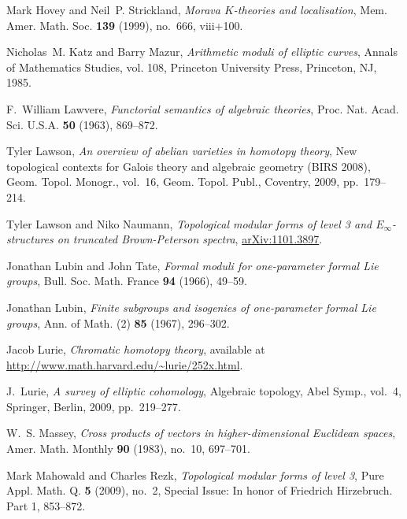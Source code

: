 \documentclass{gtpart}
\theoremstyle{definition}
\theoremstyle{remark}
\begin{document}
\begin{thebibliography}
Mark Hovey and Neil~P. Strickland, \emph{Morava {$K$}-theories and
  localisation}, Mem. Amer. Math. Soc. \textbf{139} (1999), no.~666, viii+100.

Nicholas~M. Katz and Barry Mazur, \emph{Arithmetic moduli of elliptic curves},
  Annals of Mathematics Studies, vol. 108, Princeton University Press,
  Princeton, NJ, 1985. 

F.~William Lawvere, \emph{Functorial semantics of algebraic theories}, Proc.
  Nat. Acad. Sci. U.S.A. \textbf{50} (1963), 869--872. 

Tyler Lawson, \emph{An overview of abelian varieties in homotopy theory}, New
  topological contexts for {G}alois theory and algebraic geometry ({BIRS}
  2008), Geom. Topol. Monogr., vol.~16, Geom. Topol. Publ., Coventry, 2009,
  pp.~179--214. 

Tyler Lawson and Niko Naumann, \emph{Topological modular forms of level 3 and
  ${E}_\infty$-structures on truncated {B}rown-{P}eterson spectra},
  \href{http://arxiv.org/abs/1101.3897}{arXiv:1101.3897}.

Jonathan Lubin and John Tate, \emph{Formal moduli for one-parameter formal
  {L}ie groups}, Bull. Soc. Math. France \textbf{94} (1966), 49--59.

Jonathan Lubin, \emph{Finite subgroups and isogenies of one-parameter formal
  {L}ie groups}, Ann. of Math. (2) \textbf{85} (1967), 296--302. 

Jacob Lurie, \emph{Chromatic homotopy theory}, available at
  \url{http://www.math.harvard.edu/~lurie/252x.html}.

J.~Lurie, \emph{A survey of elliptic cohomology}, Algebraic topology, Abel
  Symp., vol.~4, Springer, Berlin, 2009, pp.~219--277. 

W.~S. Massey, \emph{Cross products of vectors in higher-dimensional {E}uclidean
  spaces}, Amer. Math. Monthly \textbf{90} (1983), no.~10, 697--701. 

Mark Mahowald and Charles Rezk, \emph{Topological modular forms of level 3},
  Pure Appl. Math. Q. \textbf{5} (2009), no.~2, Special Issue: In honor of
  Friedrich Hirzebruch. Part 1, 853--872. 


\end{thebibliography}
\end{document}
